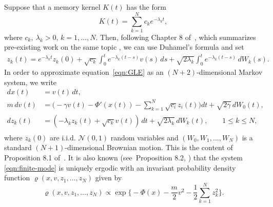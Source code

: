 \documentclass[11pt]{amsart}
\theoremstyle{definition}
\theoremstyle{definition}
\theoremstyle{plain}
\numberwithin{equation}{section}
\begin{document}
Suppose that a memory kernel $K(t)$ has the form
\begin{equation}\label{eqn:K-finite-mode}
K(t)=\sum_{k=1}^N c_k e^{-\lambda_k t},
\end{equation}
where $c_k,\ \lambda_k>0$, $k=1,\dots,N$. Then, following Chapter 8 of~\cite{pavliotis2014stochastic}, which summarizes pre-existing work on the same topic \cite{ottobre2011asymptotic,goychuk2012viscoelastic}, we can use Duhamel's formula and set
\begin{align*}
z_k(t)= e^{-\lambda_k t} z_k(0) + \sqrt{c_k} \int_0^t e^{-\lambda_k(t-s)} v(s) \, ds + \sqrt{2\lambda_k} \int_0^t e^{-\lambda_k (t-s) } \, dW_k(s).
\end{align*}
In order to approximate equation~\eqref{eqn:GLE} as an $(N+2)$-dimensional Markov system, we write
\begin{equation} \label{eqn:finite-mode}
\begin{aligned}
d x(t) &= v(t) \, d t,\\
m\, d v(t)&=\Big(-\gamma v(t)-\Phi'(x(t))-\sum_{k=1}^N \sqrt{c_i} z_i(t)\Big)dt+\sqrt{2\gamma}\, dW_0(t),\\
d z_k(t)&=(-\lambda_k z_k(t)+ \sqrt{c_k}v(t))\, dt+\sqrt{2\lambda_k}\, dW_k(t),\qquad 1\leq k\leq N,\\
\end{aligned}
\end{equation}
where $z_k(0)$ are i.i.d. $\mathcal{N}(0,1)$ random variables and $(W_0,W_1,\dots,W_N)$ is a standard $(N+1)$-dimensional Brownian motion. This is the content of Proposition 8.1 of~\cite{pavliotis2014stochastic}.  It is also known (see~Proposition 8.2, \cite{pavliotis2014stochastic}) that the system \eqref{eqn:finite-mode} is uniquely ergodic with an invariant probability density function $\varrho(x,v,z_1,\dots,z_N)$ given by
\begin{equation} \label{eqn:density-finite-mode}
\varrho(x,v,z_1,\dots,z_N) \propto\exp\Big\{-\Phi(x)-\frac{m}{2}v^2-\frac{1}{2}\sum_{k=1}^N  z_k^2\Big\}.  
\end{equation}
\end{document}
